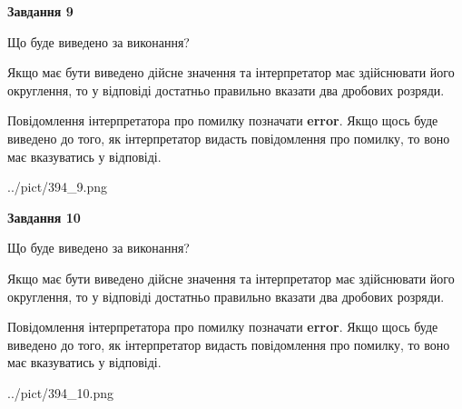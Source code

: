 \documentclass[12pt, ukrainian]{article}
\begin{document}
{\begin {Large}
{\begin {center}\textbf{Завдання 9}\end {center}}\par
Що буде виведено за виконання? \par

Якщо має бути виведено дійсне значення та інтерпретатор має здійснювати його округлення, 
то у відповіді достатньо правильно вказати два дробових розряди.

Повідомлення інтерпретатора про помилку позначати \textbf{error}.
Якщо щось буде виведено до того, як інтерпретатор видасть повідомлення про помилку, 
то воно має вказуватись у відповіді. \par

\begin{center}
	{../pict/394_9.png}
\end{center}
\newpage

{\begin {center}\textbf{Завдання 10}\end {center}}\par
Що буде виведено за виконання? \par

Якщо має бути виведено дійсне значення та інтерпретатор має здійснювати його округлення, 
то у відповіді достатньо правильно вказати два дробових розряди.

Повідомлення інтерпретатора про помилку позначати \textbf{error}.
Якщо щось буде виведено до того, як інтерпретатор видасть повідомлення про помилку, 
то воно має вказуватись у відповіді. \par

\begin{center}
	{../pict/394_10.png}
\end{center}
\newpage

\end {Large}}
\end{document}
